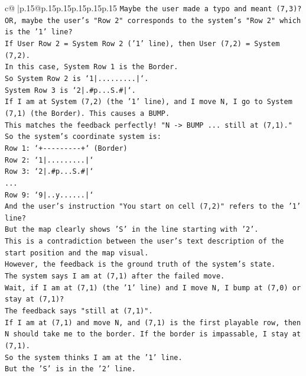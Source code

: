 \documentclass{article}
\begin{document}
{\begin{supertabular}{c@{$\;$}|p{.15\linewidth}@{}p{.15\linewidth}p{.15\linewidth}p{.15\linewidth}p{.15\linewidth}p{.15\linewidth}}
{{{\texttt{Maybe the user made a typo and meant (7,3)?} \\
\texttt{OR, maybe the user's "Row 2" corresponds to the system's "Row 2" which is the '1' line?} \\
\texttt{If User Row 2 = System Row 2 ('1' line), then User (7,2) = System (7,2).} \\
\texttt{In this case, System Row 1 is the Border.} \\
\texttt{So System Row 2 is `1|.........|`.} \\
\texttt{System Row 3 is `2|.\#p...S.\#|`.} \\
\texttt{If I am at System (7,2) (the '1' line), and I move N, I go to System (7,1) (the Border). This causes a BUMP.} \\
\texttt{This matches the feedback perfectly! "N {-}> BUMP ... still at (7,1)."} \\
\texttt{So the system's coordinate system is:} \\
\texttt{Row 1: `+{-}{-}{-}{-}{-}{-}{-}{-}{-}+` (Border)} \\
\texttt{Row 2: `1|.........|`} \\
\texttt{Row 3: `2|.\#p...S.\#|`} \\
\texttt{...} \\
\texttt{Row 9: `9|..y......|`} \\
\texttt{And the user's instruction "You start on cell (7,2)" refers to the '1' line?} \\
\texttt{But the map clearly shows 'S' in the line starting with '2'.} \\
\texttt{This is a contradiction between the user's text description of the start position and the map visual.} \\
\texttt{However, the feedback is the ground truth of the system's state.} \\
\texttt{The system says I am at (7,1) after the failed move.} \\
\texttt{Wait, if I am at (7,1) (the '1' line) and I move N, I bump at (7,0) or stay at (7,1)?} \\
\texttt{The feedback says "still at (7,1)".} \\
\texttt{If I am at (7,1) and move N, and (7,1) is the first playable row, then N should take me to the border. If the border is impassable, I stay at (7,1).} \\
\texttt{So the system thinks I am at the '1' line.} \\
\texttt{But the 'S' is in the '2' line.} \\
}}}
\end{supertabular}}
\end{document}

